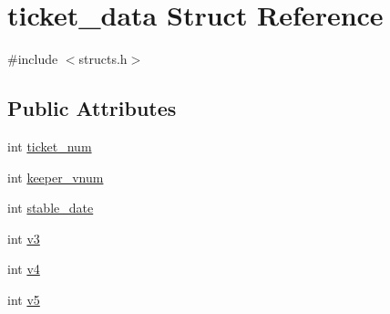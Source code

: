 \hypertarget{structticket__data}{\section{ticket\-\_\-data Struct Reference}
\label{structticket__data}
}


{\ttfamily \#include $<$structs.\-h$>$}

\subsection*{Public Attributes}
\begin{DoxyCompactItemize}
\item 
int \hyperlink{structticket__data_a3f07c5664b95e0d5bc6f28315462b044}{ticket\-\_\-num}
\item 
int \hyperlink{structticket__data_a6a41b7824dc8014d01492d101a87da55}{keeper\-\_\-vnum}
\item 
int \hyperlink{structticket__data_ab249e3b12b7c214c269a411553be4591}{stable\-\_\-date}
\item 
int \hyperlink{structticket__data_a49e2dd23e6aaf1ffba0db9a4138f89a7}{v3}
\item 
int \hyperlink{structticket__data_aec88d5f38898662e1b7d0035ab259c8a}{v4}
\item 
int \hyperlink{structticket__data_a436bfddcf5066e7f186a9281ae7e818e}{v5}
\end{DoxyCompactItemize}


